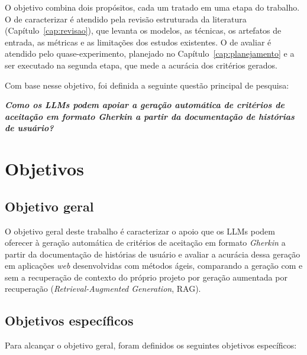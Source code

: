 O objetivo combina dois propósitos, cada um tratado em uma etapa do trabalho. O de caracterizar é atendido pela revisão estruturada da literatura (Capítulo~\ref{cap:revisao}), que levanta os modelos, as técnicas, os artefatos de entrada, as métricas e as limitações dos estudos existentes. O de avaliar é atendido pelo quase-experimento, planejado no Capítulo~\ref{cap:planejamento} e a ser executado na segunda etapa, que mede a acurácia dos critérios gerados.

Com base nesse objetivo, foi definida a seguinte questão principal de pesquisa:

\begin{center}
\textbf{\textit{Como os LLMs podem apoiar a geração automática de critérios de aceitação em formato Gherkin a partir da documentação de histórias de usuário?}}
\end{center}

\section{Objetivos}
\label{sec:objetivos}

\subsection{Objetivo geral}

O objetivo geral deste trabalho é caracterizar o apoio que os LLMs podem oferecer à geração automática de critérios de aceitação em formato \textit{Gherkin} a partir da documentação de histórias de usuário e avaliar a acurácia dessa geração em aplicações \textit{web} desenvolvidas com métodos ágeis, comparando a geração com e sem a recuperação de contexto do próprio projeto por geração aumentada por recuperação (\textit{Retrieval-Augmented Generation}, RAG).



\subsection{Objetivos específicos}

Para alcançar o objetivo geral, foram definidos os seguintes objetivos específicos:

